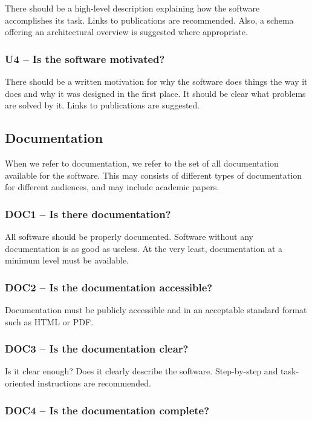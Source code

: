 \documentclass[a4paper,11pt]{article}
\begin{document}
There should be a high-level description explaining how the software
accomplishes its task. Links to publications are recommended. Also, a schema
offering an architectural overview is suggested where appropriate. 

\subsubsection{U4 -- Is the software motivated?}

There should be a written motivation for why the software does things the way
it does and why it was designed in the first place. It should be clear what
problems are solved by it. Links to publications are suggested.

\subsection{Documentation}

When we refer to documentation, we refer to the set of all documentation
available for the software. This may consists of different types of
documentation for different audiences, and may include academic papers.

\subsubsection{DOC1 -- Is there documentation?}

All software should be properly documented. Software without any documentation
is as good as useless. At the very least, documentation at a minimum level
must be available. 

\subsubsection{DOC2 -- Is the documentation accessible?}

Documentation must be publicly accessible and in an acceptable standard format
such as HTML or PDF.

\subsubsection{DOC3 -- Is the documentation clear?}

Is it clear enough? Does it clearly describe the software. Step-by-step
and task-oriented instructions are recommended.

\subsubsection{DOC4 -- Is the documentation complete?}
\end{document}
